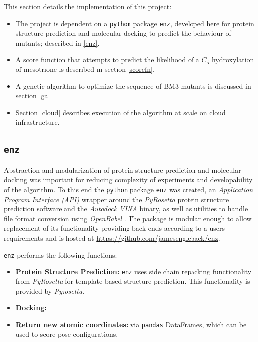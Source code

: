 \documentclass[16pt]{article}
\begin{document}
This section details the implementation of this project:
\begin{itemize}
	\item The project is dependent on a \texttt{python} package \texttt{enz}, developed here for protein structure prediction and molecular docking to predict the behaviour of mutants; described in \ref{enz}.
	\item A score function that attempts to predict the likelihood of a $C_5$ hydroxylation of mesotrione is described in section \ref{scorefn}.
	\item A genetic algorithm to optimize the sequence of BM3 mutants is discussed in section \ref{ga} 
	\item Section \ref{cloud} describes execution of the algorithm at scale on cloud infrastructure.
\end{itemize}


\subsection{\texttt{enz} \label{enz}}

Abstraction and modularization of protein structure prediction and molecular docking was important for reducing complexity of experiments and developability of the algorithm.
To this end the \texttt{python} package \texttt{enz} was created, an \textit{Application Program Interface (API)} wrapper around the \textit{PyRosetta} \cite{chaudhury2010pyrosetta} protein structure prediction software and the \textit{Autodock VINA} \cite{trott2010autodock} binary, as well as utilities to handle file format conversion using \textit{OpenBabel} \cite{o2011open}.
The package is modular enough to allow replacement of its functionality-providing back-ends according to a users requirements and is hosted at \href{https://github.com/jamesengleback/enz}{https://github.com/jamesengleback/enz}.

\texttt{enz} performs the following functions:
\begin{itemize}
	\item \textbf{Protein Structure Prediction:} \texttt{enz} uses side chain repacking \cite{dunbrack1993backbone} functionality from \textit{PyRosetta} for template-based structure prediction. 
		This functionality is provided by \textit{Pyrosetta}.
	\item \textbf{Docking:}
	\item \textbf{Return new atomic coordinates:} via \texttt{pandas} DataFrames, which can be used to score pose configurations.
\end{itemize}
\end{document}

